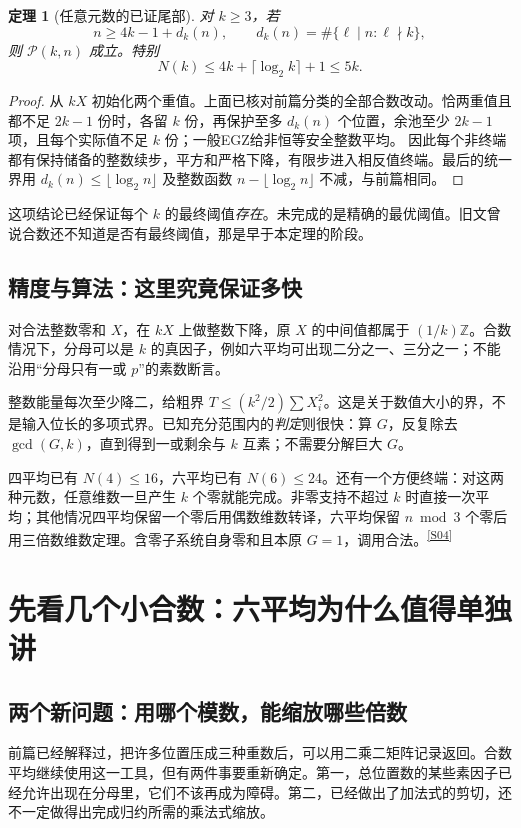 \documentclass[11pt,a4paper,oneside,openany]{book}
\newcommand{\Z}{\mathbb Z}\newcommand{\Q}{\mathbb Q}\newcommand{\F}{\mathbb F}\newcommand{\CC}{\mathbb C}
\newcommand{\src}[1]{\textsuperscript{\hyperref[source:#1]{[#1]}}}
\newtheorem{theorem}{定理}[chapter]
\theoremstyle{definition}\newtheorem{example}[theorem]{例}\newtheorem{conjecture}[theorem]{猜想}
\numberwithin{equation}{chapter}\setcounter{tocdepth}{1}
\begin{document}
\begin{theorem}[任意元数的已证尾部]
对 $k\ge3$，若
\[n\ge4k-1+d_k(n),\qquad d_k(n)=\#\{\ell\mid n:\ell\nmid k\},
\]
则 $\mathcal P(k,n)$ 成立。特别
\[N(k)\le4k+\lceil\log_2k\rceil+1\le5k.
\]
\end{theorem}
\begin{proof}
从 $kX$ 初始化两个重值。上面已核对前篇分类的全部合数改动。恰两重值且都不足 $2k-1$ 份时，各留 $k$ 份，再保护至多 $d_k(n)$ 个位置，余池至少 $2k-1$ 项，且每个实际值不足 $k$ 份；一般EGZ给非恒等安全整数平均。
因此每个非终端都有保持储备的整数续步，平方和严格下降，有限步进入相反值终端。最后的统一界用 $d_k(n)\le\lfloor\log_2n\rfloor$ 及整数函数 $n-\lfloor\log_2n\rfloor$ 不减，与前篇相同。
\end{proof}

这项结论已经保证每个 $k$ 的最终阈值\emph{存在}。未完成的是精确的最优阈值。旧文曾说合数还不知道是否有最终阈值，那是早于本定理的阶段。

\section{精度与算法：这里究竟保证多快}
对合法整数零和 $X$，在 $kX$ 上做整数下降，原 $X$ 的中间值都属于 $(1/k)\Z$。合数情况下，分母可以是 $k$ 的真因子，例如六平均可出现二分之一、三分之一；不能沿用“分母只有一或 $p$”的素数断言。

整数能量每次至少降二，给粗界 $T\le(k^2/2)\sum X_i^2$。这是关于数值大小的界，不是输入位长的多项式界。已知充分范围内的\emph{判定}则很快：算 $G$，反复除去 $\gcd(G,k)$，直到得到一或剩余与 $k$ 互素；不需要分解巨大 $G$。

四平均已有 $N(4)\le16$，六平均已有 $N(6)\le24$。还有一个方便终端：对这两种元数，任意维数一旦产生 $k$ 个零就能完成。非零支持不超过 $k$ 时直接一次平均；其他情况四平均保留一个零后用偶数维数转译，六平均保留 $n\bmod3$ 个零后用三倍数维数定理。含零子系统自身零和且本原 $G=1$，调用合法。\src{S04}


\chapter{先看几个小合数：六平均为什么值得单独讲}\label{ch:small}
\section{两个新问题：用哪个模数，能缩放哪些倍数}
前篇已经解释过，把许多位置压成三种重数后，可以用二乘二矩阵记录返回。合数平均继续使用这一工具，但有两件事要重新确定。第一，总位置数的某些素因子已经允许出现在分母里，它们不该再成为障碍。第二，已经做出了加法式的剪切，还不一定做得出完成归约所需的乘法式缩放。
\end{document}
